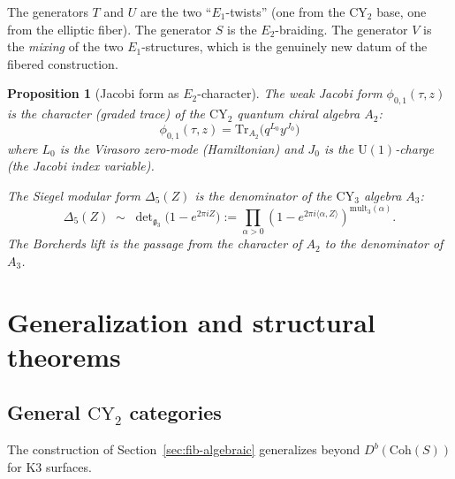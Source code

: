 \documentclass[11pt]{article}
\theoremstyle{plain}
\newtheorem{proposition}[theorem]{Proposition}
\theoremstyle{definition}
\theoremstyle{remark}
\newcommand{\CY}{\mathrm{CY}}
\newcommand{\Tr}{\mathrm{Tr}}
\newcommand{\Coh}{\mathrm{Coh}}
\newcommand{\Eone}{E_1}
\newcommand{\Etwo}{E_2}
\newcommand{\frakg}{\mathfrak{g}}
\begin{document}
The generators $T$ and $U$ are the two ``$\Eone$-twists'' (one from the $\CY_2$
base, one from the elliptic fiber). The generator $S$ is the $\Etwo$-braiding.
The generator $V$ is the \emph{mixing} of the two $\Eone$-structures, which is
the genuinely new datum of the fibered construction.

\begin{proposition}[Jacobi form as $\Etwo$-character]
\label{prop:jacobi-e2-char}
The weak Jacobi form $\phi_{0,1}(\tau, z)$ is the character (graded trace) of
the $\CY_2$ quantum chiral algebra $A_2$:
\[
 \phi_{0,1}(\tau, z) = \Tr_{A_2}\bigl(q^{L_0} y^{J_0}\bigr)
\]
where $L_0$ is the Virasoro zero-mode (Hamiltonian) and $J_0$ is the
$\mathrm{U}(1)$-charge (the Jacobi index variable).

The Siegel modular form $\Delta_5(Z)$ is the denominator of the $\CY_3$
algebra $A_3$:
\[
 \Delta_5(Z) \;\sim\; \det\nolimits_{\frakg_3}\bigl(1 - e^{2\pi i Z}\bigr)
 := \prod_{\alpha > 0} (1 - e^{2\pi i \langle \alpha, Z \rangle})^{\mathrm{mult}_3(\alpha)}.
\]
The Borcherds lift is the passage from the character of $A_2$ to the
denominator of $A_3$.
\end{proposition}

\section{Generalization and structural theorems}
\label{sec:fib-general}

\subsection{General $\CY_2$ categories}
\label{subsec:general-cy2}

The construction of Section~\ref{sec:fib-algebraic} generalizes beyond
$D^b(\Coh(S))$ for K3 surfaces.
\end{document}
